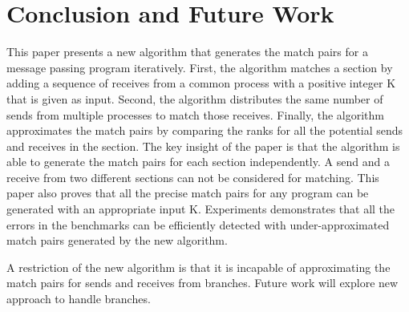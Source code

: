\section{Conclusion and Future Work}
This paper presents a new algorithm that generates the match pairs for a message passing program iteratively. First, the algorithm matches a section by adding a sequence of receives from a common process with a positive integer K that is given as input. Second, the algorithm distributes the same number of sends from multiple processes to match those receives. Finally, the algorithm approximates the match pairs by comparing the ranks for all the potential sends and receives in the section. The key insight of the paper is that the algorithm is able to generate the match pairs for each section independently. A send and a receive from two different sections can not be considered for matching. This paper also proves that all the precise match pairs for any program can be generated with an appropriate input K. Experiments demonstrates that all the errors in the benchmarks can be efficiently detected with under-approximated match pairs generated by the new algorithm. 

A restriction of the new algorithm is that it is incapable of approximating the match pairs for sends and receives from branches. Future work will explore new approach to handle branches.


